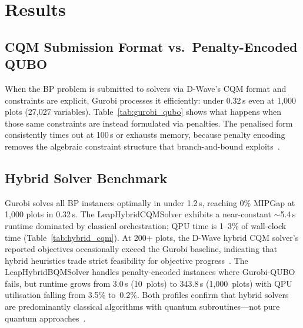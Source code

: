 \documentclass[conference]{IEEEtran}
\begin{document}
\section{Results}
\label{sec:Results}
\subsection{CQM Submission Format vs.\ Penalty-Encoded QUBO}

When the BP problem is submitted to solvers via D-Wave's CQM format and constraints are explicit, Gurobi processes it efficiently: under 0.32\,s even at 1{,}000 plots (27{,}027 variables).
Table~\ref{tab:gurobi_qubo} shows what happens when those same constraints are instead formulated via penalties.
The penalised form consistently times out at 100\,s or exhausts memory, because penalty encoding removes the algebraic constraint structure that branch-and-bound exploits~\cite{wolsey1998integer}.


\begin{table}[t]
\centering
\caption{Gurobi on BP: D-Wave CQM submission format (explicit constraints) vs.\ penalty-encoded QUBO.}
\label{tab:gurobi_qubo}
\setlength{\tabcolsep}{3.5pt}
\footnotesize
{}
\end{table}

\subsection{Hybrid Solver Benchmark}

Gurobi solves all BP instances optimally in under 1.2\,s, reaching 0\% MIPGap at 1{,}000 plots in 0.32\,s.
The LeapHybridCQMSolver exhibits a near-constant ${\sim}$5.4\,s runtime dominated by classical orchestration; QPU time is 1--3\% of wall-clock time (Table~\ref{tab:hybrid_cqm}).
At 200+ plots, the D-Wave hybrid CQM solver's reported objectives occasionally exceed the Gurobi baseline, indicating that hybrid heuristics trade strict feasibility for objective progress~\cite{dwave:solver_properties_all}.
The LeapHybridBQMSolver handles penalty-encoded instances where Gurobi-QUBO fails, but runtime grows from 3.0\,s (10~plots) to 343.8\,s (1{,}000~plots) with QPU utilisation falling from 3.5\% to~0.2\%.
Both profiles confirm that hybrid solvers are predominantly classical algorithms with quantum subroutines---not pure quantum approaches~\cite{okada2020breaking}.
\end{document}
